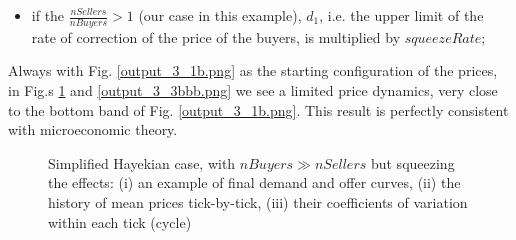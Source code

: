 \documentclass[10pt]{report}
\begin{document}
\begin{appendices}
\begin{itemize}
\item if the $\frac{nSellers}{nBuyers}>1$ (our case in this example), $d_1$, i.e. the upper limit of the rate of correction of the price of the buyers, is multiplied by $squeezeRate$;
\end{itemize}


Always with Fig. \ref{output_3_1b.png} as the starting configuration of the prices, in Fig.s \ref{output_3_2bbb.png} and \ref{output_3_3bbb.png} we see a limited price dynamics, very close to the bottom band of Fig. \ref{output_3_1b.png}. This result is perfectly consistent with microeconomic theory.

\begin{figure}[H]
\begin{center}
\caption{Simplified Hayekian case, with $nBuyers \gg nSellers$ but squeezing the effects: (i) an example of final demand and offer curves, (ii) the history of mean prices tick-by-tick, (iii) their coefficients of variation within each tick (cycle)}
\label{output_3_2bbb.png}
\end{center}
\end{figure}


\end{appendices}
\end{document}
